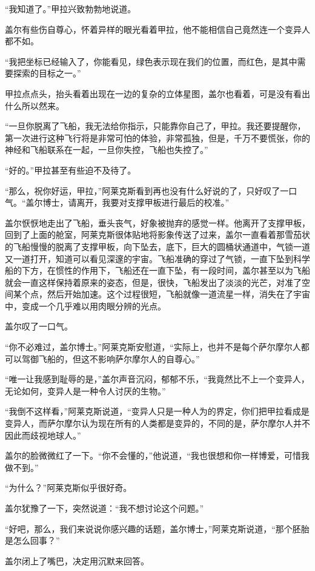 “我知道了。”甲拉兴致勃勃地说道。 

盖尔有些伤自尊心，怀着异样的眼光看着甲拉，他不能相信自己竟然连一个变异人都不如。 

“我把坐标已经输入了，你能看见，绿色表示现在我们的位置，而红色，是其中需要探索的目标之一。” 

甲拉点点头，抬头看着出现在一边的复杂的立体星图，盖尔也看着，可是没有看出什么所以然来。 

“一旦你脱离了飞船，我无法给你指示，只能靠你自己了，甲拉。我还要提醒你，第一次进行这种飞行将是非常可怕的体验，非常孤独，但是，千万不要慌张，你的神经和飞船联系在一起，一旦你失控，飞船也失控了。” 

“好的。”甲拉甚至有些迫不及待了。 

“那么，祝你好运，甲拉，”阿莱克斯看到再也没有什么好说的了，只好叹了一口气。“盖尔博士，请离开，我要对支撑甲板进行最后的校准。” 

盖尔恹恹地走出了飞船，垂头丧气，好象被抛弃的感觉一样。他离开了支撑甲板，回到了上面的舱室，阿莱克斯很体贴地将影象传送了过来，盖尔一直看着那雪茄状的飞船慢慢的脱离了支撑甲板，向下坠去，底下，巨大的圆桶状通道中，气锁一道又一道打开，知道可以看见深邃的宇宙。飞船准确的穿过了气锁，一直下坠到科学船的下方，在惯性的作用下，飞船还在一直下坠，有一段时间，盖尔甚至以为飞船就会一直这样保持着原来的姿态，但是，很快，飞船发出了淡淡的光芒，对准了空间某个点，然后开始加速。这个过程很短，飞船就像一道流星一样，消失在了宇宙中，变成一个几乎难以用肉眼分辨的光点。 

盖尔叹了一口气。 

“你不必难过，盖尔博士。”阿莱克斯安慰道，“实际上，也并不是每个萨尔摩尔人都可以驾御飞船的，但这不影响萨尔摩尔人的自尊心。” 

“唯一让我感到耻辱的是，”盖尔声音沉闷，郁郁不乐，“我竟然比不上一个变异人，无论如何，变异人是一种令人讨厌的生物。” 

“我倒不这样看，”阿莱克斯说道，“变异人只是一种人为的界定，你们把甲拉看成是变异人，而萨尔摩尔认为现在所有的人类都是变异的，不同的是，萨尔摩尔人并不因此而歧视地球人。” 

盖尔的脸微微红了一下。“你不会懂的，”他说道，“我也很想和你一样博爱，可惜我做不到。” 

“为什么？”阿莱克斯似乎很好奇。 

盖尔犹豫了一下，突然说道：“我不想讨论这个问题。” 

“好吧，那么，我们来说说你感兴趣的话题，盖尔博士，”阿莱克斯说道，“那个胚胎是怎么回事？” 

盖尔闭上了嘴巴，决定用沉默来回答。 

